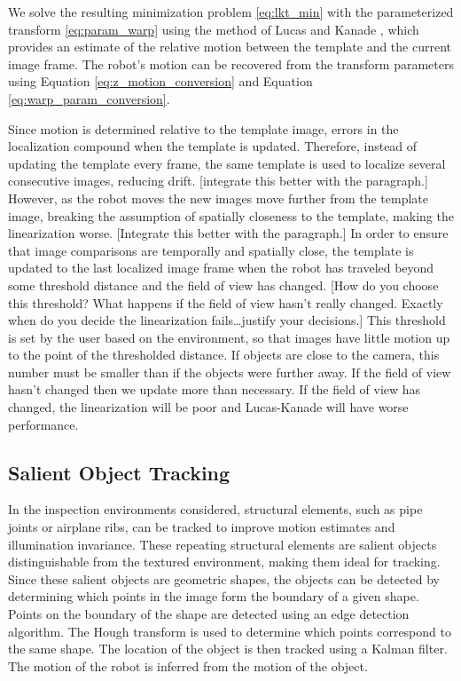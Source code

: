 \documentclass[letterpaper, 10 pt, conference]{ieeeconf}
\newcommand{\comment}[1]{{\color{red}[#1]}}
\begin{document}
We solve the resulting minimization problem \eqref{eq:lkt_min} with the parameterized transform \eqref{eq:param_warp} using the method of Lucas and Kanade \cite{Lucas81, lucaskanade}, which provides an estimate of the relative motion between the template and the current image frame. The robot's motion can be recovered from the transform parameters using Equation \eqref{eq:z_motion_conversion} and Equation \eqref{eq:warp_param_conversion}.

Since motion is determined relative to the template image, errors in the localization compound when the template is updated. Therefore, instead of updating the template every frame, the same template is used to localize several consecutive images, reducing drift.
\comment{integrate this better with the paragraph.} However, as the robot moves the new images move further from the template image, breaking the assumption of spatially closeness to the template, making the linearization worse. 
\comment{Integrate this better with the paragraph.} In order to ensure that image comparisons are temporally and spatially close, the template is updated to the last localized image frame when the robot has traveled beyond some threshold distance and the field of view has changed.
\comment{How do you choose this threshold?  What happens if the field of view hasn’t really changed.  Exactly when do you decide the linearization fails…justify your decisions.} This threshold is set by the user based on the environment, so that images have little motion up to the point of the thresholded distance. If objects are close to the camera, this number must be smaller than if the objects were further away. If the field of view hasn't changed then we update more than necessary. If the field of view has changed, the linearization will be poor and Lucas-Kanade will have worse performance.

\subsection{Salient Object Tracking}

In the inspection environments considered, structural elements, such as pipe joints or airplane ribs, can be tracked to improve motion estimates and illumination invariance. These repeating structural elements are salient objects distinguishable from the textured environment, making them ideal for tracking. Since these salient objects are geometric shapes, the objects can be detected by determining which points in the image form the boundary of a given shape. Points on the boundary of the shape are detected using an edge detection algorithm. The Hough transform is used to determine which points correspond to the same shape. The location of the object is then tracked using a Kalman filter. The motion of the robot is inferred from the motion of the object.
\end{document}
